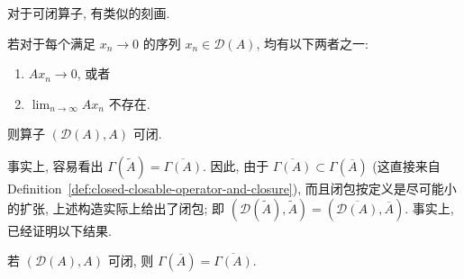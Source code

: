 对于可闭算子, 有类似的刻画.

\begin{Lemma}
\label{lem:closable-operator-zero-sequence-criterion}
若对于每个满足 $x_n\to0$ 的序列 $x_n\in\mathcal{D}(A)$, 均有以下两者之一:\begin{enumerate}\item $Ax_n\to0$, 或者\item $\lim_{n\to\infty}Ax_n$ 不存在.\end{enumerate}则算子 $(\mathcal{D}(A),A)$ 可闭.
\end{Lemma}

\begingroup
{}
\renewcommand{\endProof}{\par\nobreak\hfill$\blacksquare$\par\vspace{0.1cm}}
\endgroup

事实上, 容易看出 $\Gamma(\widetilde A)=\overline{\Gamma(A)}$. 因此, 由于 $\overline{\Gamma(A)}\subset\Gamma(\overline A)$ (这直接来自 Definition~\ref{def:closed-closable-operator-and-closure}), 而且闭包按定义是尽可能小的扩张, 上述构造实际上给出了闭包; 即 $(\mathcal{D}(\widetilde A),\widetilde A)=(\overline{\mathcal{D}(A)},\overline A)$. 事实上, 已经证明以下结果.

\begin{Corollary}
\label{cor:closure-graph-is-graph-closure}
若 $(\mathcal{D}(A),A)$ 可闭, 则 $\Gamma(\overline A)=\overline{\Gamma(A)}$.
\end{Corollary}
